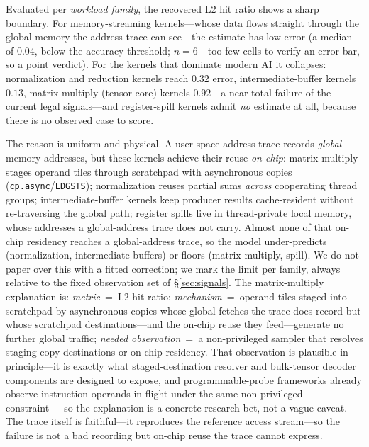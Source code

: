 \documentclass[conference]{IEEEtran}
\begin{document}
Evaluated per \emph{workload family}, the recovered L2 hit ratio shows a
sharp boundary. For memory-streaming kernels---whose data flows straight
through the global memory the address trace can see---the estimate has low error
(a median of $0.04$, below the accuracy threshold; $n{=}6$---too few cells to
verify an error bar, so a point verdict). For the kernels that dominate modern
AI it collapses: normalization and reduction kernels reach $0.32$ error,
intermediate-buffer kernels $0.13$, matrix-multiply (tensor-core) kernels
$0.92$---a near-total failure of the current legal signals---and register-spill
kernels admit \emph{no} estimate at all, because there is no observed case to
score.

The reason is uniform and physical. A user-space address trace records \emph{global}
memory addresses, but these kernels achieve their reuse \emph{on-chip}:
matrix-multiply stages operand tiles through scratchpad with asynchronous copies
(\texttt{cp.async}/\texttt{LDGSTS}); normalization reuses partial sums
\emph{across} cooperating thread groups; intermediate-buffer kernels keep
producer results cache-resident without re-traversing the global path; register spills live in
thread-private local memory, whose addresses a global-address trace does not
carry. Almost none of that on-chip residency
reaches a global-address trace, so the model under-predicts (normalization,
intermediate buffers) or floors (matrix-multiply, spill). We do not paper over this with a
fitted correction; we mark the limit per family, always relative to the
fixed observation set of \S\ref{sec:signals}. The matrix-multiply explanation is:
\emph{metric}~=~L2 hit ratio; \emph{mechanism}~=~operand tiles staged into
scratchpad by asynchronous copies whose global fetches the trace does record
but whose scratchpad destinations---and the on-chip reuse they feed---generate
no further global traffic;
\emph{needed observation}~=~a non-privileged sampler that resolves staging-copy
destinations or on-chip residency. That observation is plausible in
principle---it is exactly what staged-destination resolver and
bulk-tensor decoder components are designed to expose, and
programmable-probe frameworks already observe instruction operands in flight
under the same non-privileged constraint~\cite{huang2025neutrino}---so the
explanation is a concrete research bet, not a vague caveat. The trace
itself is faithful---it reproduces the reference access stream---so the failure
is not a bad recording but on-chip reuse the trace cannot express.
\end{document}
